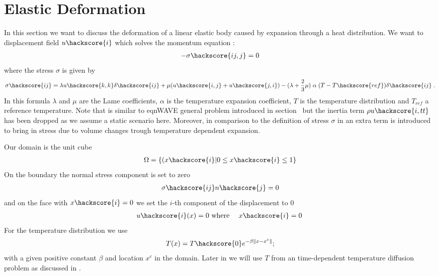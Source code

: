 \section{Elastic Deformation}
\label{ELASTIC CHAP}
In this section we want to discuss the deformation of a linear elastic body caused by expansion through a heat distribution. We want 
to displacement field $u\hackscore{i}$ which solves the momentum equation
:
\begin{eqnarray}\label{HEATEDBLOCK general problem}
 - \sigma\hackscore{ij,j}=0
\end{eqnarray}
where the stress $\sigma$ is given by
\begin{eqnarray}\label{HEATEDBLOCK linear elastic}
 \sigma\hackscore{ij}= \lambda u\hackscore{k,k} \delta\hackscore{ij} + \mu ( u\hackscore{i,j} + u\hackscore{j,i})
 - (\lambda+\frac{2}{3} \mu)  \; \alpha  \;  (T-T\hackscore{ref})\delta\hackscore{ij} \;.
\end{eqnarray}
In this formula $\lambda$ and $\mu$ are the Lame coefficients, $\alpha$ is the 
temperature expansion coefficient, $T$ is the temperature distribution and $T_{ref}$ a reference temperature. Note that 
 is similar to eqn{WAVE general problem} introduced in section~ but the
inertia term $\rho u\hackscore{i,tt}$ has been dropped as we assume a static scenario here. Moreover, in 
comparison to the 
definition of stress $\sigma$ in  an extra term is introduced 
to bring in stress due to volume changes trough temperature dependent expansion.   

Our domain is the unit cube 
\begin{eqnarray} \label{HEATEDBLOCK natural location}
\Omega=\{(x\hackscore{i} | 0 \le x\hackscore{i} \le 1 \}
\end{eqnarray}
On the boundary the normal stress component is set to zero
\begin{eqnarray} \label{HEATEDBLOCK natural}
\sigma\hackscore{ij}n\hackscore{j}=0
\end{eqnarray}
and on the face with $x\hackscore{i}=0$ we set the $i$-th component of the displacement to $0$
\begin{eqnarray} \label{HEATEDBLOCK constraint}
u\hackscore{i}(x)=0 & \mbox{ where } & x\hackscore{i}=0 \; 
\end{eqnarray}
For the temperature distribution we use 
\begin{eqnarray} \label{HEATEDBLOCK temperature}
T(x)= T\hackscore{0} e^{-\beta \|x-x^{c}\|}; 
\end{eqnarray}
with a given positive constant $\beta$ and location $x^{c}$ in the domain. Later in  we will use
$T$ from an time-dependent temperature diffusion problem as discussed in .
   

